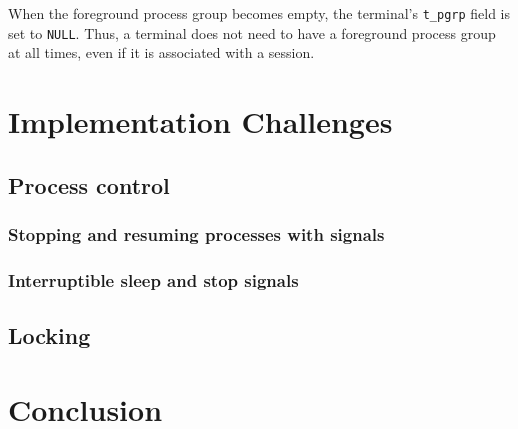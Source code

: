 \documentclass[shortabstract, manyadvisors, english, mgr]{iithesis}
\begin{document}
When the foreground process group becomes empty, the terminal's \texttt{t\_pgrp}
field is set to \texttt{NULL}. Thus, a terminal does not need to have a
foreground process group at all times, even if it is associated with a session.

\chapter{Implementation Challenges}
\section{Process control}
\subsection{Stopping and resuming processes with signals}
\subsection{Interruptible sleep and stop signals}
\section{Locking}
\chapter{Conclusion}



\end{document}
